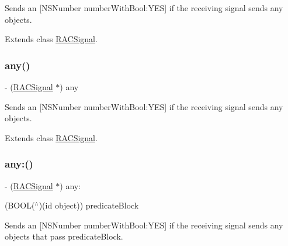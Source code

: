 Sends an \mbox{[}N\+S\+Number number\+With\+Bool\+:Y\+ES\mbox{]} if the receiving signal sends any objects. 

Extends class \mbox{\hyperlink{interface_r_a_c_signal_af64359cf92ab95039f48270a71446e08}{R\+A\+C\+Signal}}.

\mbox{\label{category_r_a_c_signal_07_operations_08_af64359cf92ab95039f48270a71446e08}} 
\subsubsection{\texorpdfstring{any()}{any()}\hspace{0.1cm}{\footnotesize\ttfamily [3/3]}}
{\footnotesize\ttfamily -\/ (\mbox{\hyperlink{interface_r_a_c_signal}{R\+A\+C\+Signal}} $\ast$) any \begin{DoxyParamCaption}{ }\end{DoxyParamCaption}}

Sends an \mbox{[}N\+S\+Number number\+With\+Bool\+:Y\+ES\mbox{]} if the receiving signal sends any objects. 

Extends class \mbox{\hyperlink{interface_r_a_c_signal_af64359cf92ab95039f48270a71446e08}{R\+A\+C\+Signal}}.

\mbox{\label{category_r_a_c_signal_07_operations_08_a4bfb6af6556526457fbf0e5d3c878536}} 
\subsubsection{\texorpdfstring{any\+:()}{any:()}\hspace{0.1cm}{\footnotesize\ttfamily [1/3]}}
{\footnotesize\ttfamily -\/ (\mbox{\hyperlink{interface_r_a_c_signal}{R\+A\+C\+Signal}} $\ast$) any\+: \begin{DoxyParamCaption}\item[{(B\+O\+OL($^\wedge$)(id object))}]{predicate\+Block }\end{DoxyParamCaption}}

Sends an \mbox{[}N\+S\+Number number\+With\+Bool\+:Y\+ES\mbox{]} if the receiving signal sends any objects that pass {\ttfamily predicate\+Block}.

